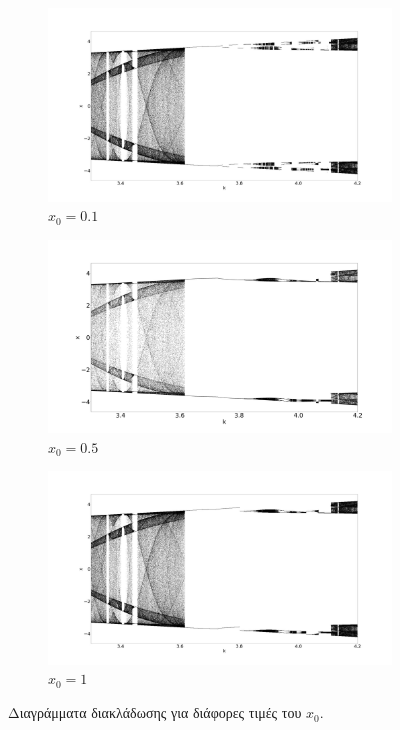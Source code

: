 \begin{figure}[ht]
	\centering
	
	\begin{subfigure}[b]{0.8\textwidth}
		\centering
		\includegraphics[width=\textwidth]{LateX images/sine q=-0.5/g3}
		\caption{$x_0=0.1$}
		\label{f:g52}
	\end{subfigure}
	\hfill
	\begin{subfigure}[b]{0.8\textwidth}
		\centering
		\includegraphics[width=\textwidth]{LateX images/sine q=-0.5/g7}
		\caption{$x_0=0.5$}
		\label{f:g53}
	\end{subfigure}
	\begin{subfigure}[b]{0.8\textwidth}
		\centering
		\includegraphics[width=\textwidth]{LateX images/sine q=-0.5/g12}
		\caption{$x_0=1$}
		\label{f:g533}
	\end{subfigure}
	
	\caption{Διαγράμματα διακλάδωσης για διάφορες τιμές του $x_0$. }
	\label{f:g237}
\end{figure}

